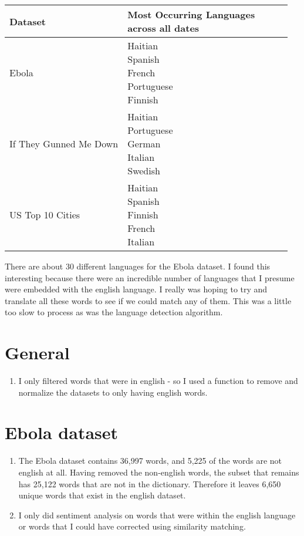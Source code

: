\documentclass[11pt, oneside]{article}
\makeatletter
\newcommand{\specialcell}[2][c]{%
  \begin{tabular}[#1]{@{}c@{}}#2\end{tabular}}
\makeatother
\begin{document}
\begin{enumerate}
\begin{tabularx}{\textwidth}{X|l|l|l|l}
\textbf{Dataset} & \specialcell{Most Occurring Languages\\across all dates}   \\
\hline Ebola & 
\specialcell{Haitian\\Spanish\\French\\Portuguese\\Finnish} \\ 
\hline If They Gunned Me Down & 
\specialcell{Haitian\\Portuguese\\German\\Italian\\Swedish} \\ 
\hline US Top 10 Cities & 
\specialcell{Haitian\\Spanish\\Finnish\\French\\Italian} \\ 
\hline \end{tabularx}
\end{enumerate}

\par There are about 30 different languages for the Ebola dataset. I found this interesting because there were an incredible number of languages that I presume were embedded with the english language. I really was hoping to try and translate all these words to see if we could match any of them. This was a little too slow to process as was the language detection algorithm. 

\section*{General}

\begin{enumerate}
\item I only filtered words that were in english - so I used a function to remove and normalize the datasets to only having english words.
\end{enumerate}

\section*{Ebola dataset}

\begin{enumerate}
\item The Ebola dataset contains 36,997 words, and 5,225 of the words are not english at all. Having removed the non-english words, the subset that remains has 25,122 words that are not in the dictionary. Therefore it leaves 6,650 unique words that exist in the english dataset. 
\item I only did sentiment analysis on words that were within the english language or words that I could have corrected using similarity matching. 
\end{enumerate}
\end{document}
